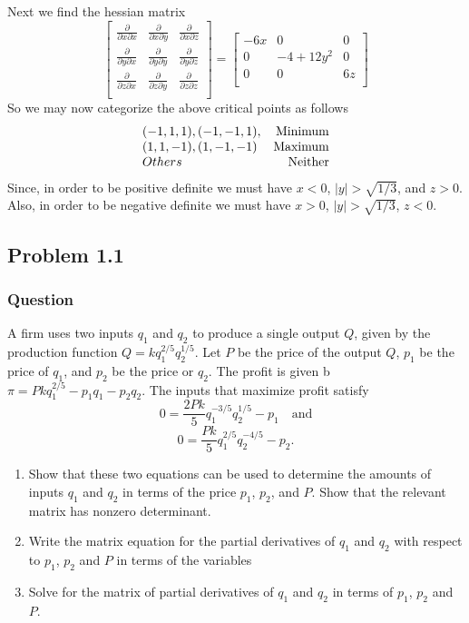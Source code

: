 \documentclass[12pt]{article}
\begin{document}
\begin{enumerate}
Next we find the hessian matrix 
\[
\left[
\begin{array}{lcr}
\frac{\partial}{\partial x \partial x} & \frac{\partial}{\partial x \partial y} & \frac{\partial}{\partial x \partial z} \\
\frac{\partial}{\partial y \partial x} & \frac{\partial}{\partial y \partial y} & \frac{\partial}{\partial y \partial z }  \\
\frac{\partial}{\partial z \partial x } & \frac{\partial}{\partial z \partial y} & \frac{\partial}{\partial z \partial z} \\
\end{array}
\right]
=
\left[
\begin{array}{lcr}
-6 x& 0&0\\
0 &-4+12 y^2& 0 \\
0 &0& 6z\\
\end{array}
\right]
\]
So we may now categorize the above critical points as follows
\[
\begin{array}{l r }
(-1,1,1),(-1,-1,1),& \mathrm{Minimum}\\
(1,1,-1), (1,-1,-1) & \mathrm{Maximum}\\
Others & \mathrm{Neither}\\
\end{array}
\]
Since, in order to be positive definite we must have $x<0$, $|y|> \sqrt{1/3}$, and $z>0$. Also, in order to be negative definite we must have $x>0$,  $|y|> \sqrt{1/3}$, $z<0$.

\end{enumerate}




\subsection{Problem 1.1}
\subsubsection{Question}
A firm uses two inputs $q_1$ and $q_2$ to produce a single output $Q$, given by the production function $Q=k q_1^{2/5}q_2^{1/5}$. Let $P$ be the price of the output $Q$, $p_1$ be the price of $q_1$, and $p_2$ be the price or $q_2$. The profit is given b $\pi = P k q_1^{2/5} - p_1q_1-p_2q_2$. The inputs that maximize profit satisfy 
\[0=\frac{2 P k}{5} q_1^{-3/5} q_2^{1/5}-p_1 \quad \mathrm{and}\]
\[0=\frac{P k}{5} q_1^{2/5}q_2^{-4/5}-p_2. \]
\begin{enumerate}
\item Show that these two equations can be used to determine the amounts of inputs $q_1$ and $q_2$ in terms of the price $p_1$, $p_2$, and $P$. Show that the relevant matrix has nonzero determinant.
\item Write the matrix equation for the partial derivatives of $q_1$ and $q_2$ with respect to $p_1$, $p_2$ and $P$ in terms of the variables
\item Solve for the matrix of partial derivatives of $q_1$ and $q_2$ in terms of $p_1$, $p_2$ and $P$.
\end{enumerate}
\end{document}
